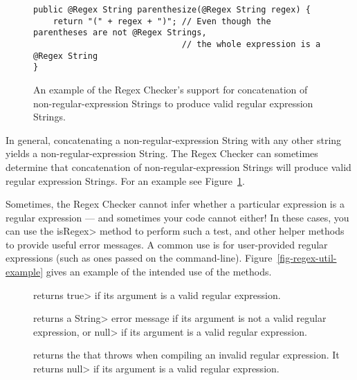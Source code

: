 \begin{figure}
\begin{Verbatim}
public @Regex String parenthesize(@Regex String regex) {
    return "(" + regex + ")"; // Even though the parentheses are not @Regex Strings,
                              // the whole expression is a @Regex String
}
\end{Verbatim}
\caption{An example of the Regex Checker's support for concatenation
of non-regular-expression Strings to produce valid regular expression Strings.}
\label{fig-regex-partial}
\end{figure}

In general, concatenating a non-regular-expression String with any other
string yields a non-regular-expression String.  The Regex Checker can
sometimes determine that concatenation of non-regular-expression Strings
will produce valid regular expression Strings. For an example see
Figure~\ref{fig-regex-partial}.



Sometimes, the Regex Checker cannot infer whether a particular expression
is a regular expression --- and sometimes your code cannot either! In
these cases, you can use the \<isRegex> method to perform such a test, and
other helper methods to provide useful error messages. A
common use is for user-provided regular expressions (such as ones passed
on the command-line).
Figure~\ref{fig-regex-util-example} gives an
example of the intended use of the  methods.

\begin{description}

\item[]
  returns \<true> if its argument is a valid regular expression.

\item[]
  returns a \<String> error message if its argument is not a valid regular
  expression, or \<null> if its argument is a valid regular expression.

\item[]
  returns the
  that 
  throws when compiling an invalid regular expression.  It returns \<null>
  if its argument is a valid regular expression.

\end{description}

